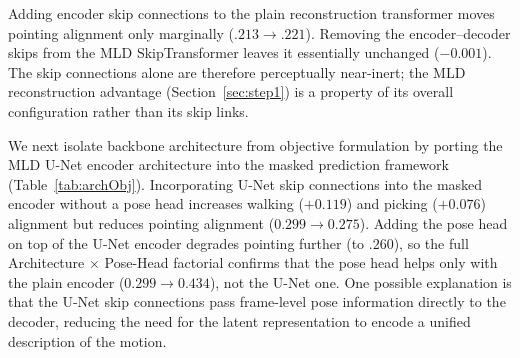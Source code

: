 \documentclass[letterpaper]{article} %
\begin{document}

Adding encoder skip connections to the plain reconstruction transformer moves pointing alignment only marginally ($.213 \to .221$). Removing the encoder--decoder skips from the MLD SkipTransformer leaves it essentially unchanged ($-0.001$). The skip connections alone are therefore perceptually near-inert; the MLD
reconstruction advantage (Section~\ref{sec:step1}) is a property of its overall configuration
rather than its skip links.

We next isolate backbone architecture from objective formulation by porting the MLD U-Net encoder
architecture into the masked prediction framework (Table~\ref{tab:archObj}).  Incorporating U-Net skip connections into the masked encoder without a pose head increases walking ($+0.119$) and picking ($+0.076$) alignment but reduces pointing alignment ($0.299 \to
0.275$). Adding the pose head on top of the U-Net encoder degrades pointing further (to $.260$), so the full Architecture $\times$ Pose-Head factorial confirms that the pose head helps only with the plain encoder ($0.299 \to 0.434$), not the U-Net one.
One possible explanation is that the U-Net skip connections pass frame-level pose information directly to the decoder, reducing the need for the latent representation to encode a unified description of the motion.



\begin{table}[htbp]
\centering
\caption{Architecture and objective interaction ($n=25$, mean $\pm$ SE).
Bold: best (highest mean) in each column; MAMP+pose (italic) is our proposed encoder.}
\small
\setlength{\tabcolsep}{4pt}
~\label{tab:archObj}
\end{table}
\end{document}
